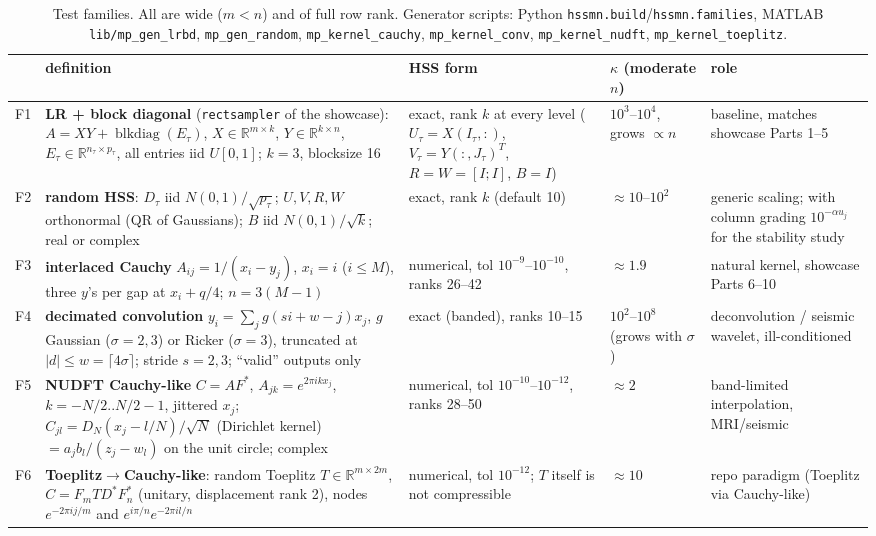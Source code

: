 \begin{table}[!htb]
\centering\footnotesize
\setlength{\tabcolsep}{3pt}
\begin{tabular}{@{}l>{\raggedright\arraybackslash}p{6.3cm}>{\raggedright\arraybackslash}p{3.4cm}>{\raggedright\arraybackslash}p{1.9cm}>{\raggedright\arraybackslash}p{2.4cm}@{}}
\toprule
& definition & HSS form & $\kappa$ (moderate $n$) & role\\
\midrule
F1 & \textbf{LR + block diagonal} (\texttt{rectsampler} of the showcase): $A=XY+\operatorname{blkdiag}(E_\tau)$, $X\in\mathbb{R}^{m\times k}$, $Y\in\mathbb{R}^{k\times n}$, $E_\tau\in\mathbb{R}^{n_\tau\times p_\tau}$, all entries iid $U[0,1]$; $k=3$, blocksize 16 & exact, rank $k$ at every level ($U_\tau=X(I_\tau,:)$, $V_\tau=Y(:,J_\tau)^T$, $R=W=[I;I]$, $B=I$) & $10^{3}$--$10^{4}$, grows $\propto n$ & baseline, matches showcase Parts 1--5\\
F2 & \textbf{random HSS}: $D_\tau$ iid $N(0,1)/\sqrt{p_\tau}$; $U,V,R,W$ orthonormal (QR of Gaussians); $B$ iid $N(0,1)/\sqrt k$; real or complex & exact, rank $k$ (default 10) & $\approx10$--$10^2$ & generic scaling; with column grading $10^{-\alpha u_j}$ for the stability study\\
F3 & \textbf{interlaced Cauchy} $A_{ij}=1/(x_i-y_j)$, $x_i=i$ ($i\le M$), three $y$'s per gap at $x_i+q/4$; $n=3(M-1)$ & numerical, tol $10^{-9}$--$10^{-10}$, ranks 26--42 & $\approx1.9$ & natural kernel, showcase Parts 6--10\\
F4 & \textbf{decimated convolution} $y_i=\sum_jg(si+w-j)x_j$, $g$ Gaussian ($\sigma=2,3$) or Ricker ($\sigma=3$), truncated at $|d|\le w=\lceil4\sigma\rceil$; stride $s=2,3$; ``valid'' outputs only & exact (banded), ranks 10--15 & $10^2$--$10^8$ (grows with $\sigma$) & deconvolution / seismic wavelet, ill-conditioned\\
F5 & \textbf{NUDFT Cauchy-like} $C=AF^*$, $A_{jk}=e^{2\pi ikx_j}$, $k=-N/2..N/2{-}1$, jittered $x_j$; $C_{jl}=D_N(x_j-l/N)/\sqrt N$ (Dirichlet kernel) $=a_jb_l/(z_j-w_l)$ on the unit circle; complex & numerical, tol $10^{-10}$--$10^{-12}$, ranks 28--50 & $\approx2$ & band-limited interpolation, MRI/seismic\\
F6 & \textbf{Toeplitz$\to$Cauchy-like}: random Toeplitz $T\in\mathbb{R}^{m\times 2m}$, $C=F_mTD^*F_n^*$ (unitary, displacement rank 2), nodes $e^{-2\pi ij/m}$ and $e^{i\pi/n}e^{-2\pi il/n}$ & numerical, tol $10^{-12}$; $T$ itself is not compressible & $\approx10$ & repo paradigm (Toeplitz via Cauchy-like)\\
\bottomrule
\end{tabular}
\caption{Test families. All are wide ($m<n$) and of full row rank. Generator scripts: Python
\texttt{hssmn.build}/\texttt{hssmn.families}, MATLAB \texttt{lib/mp\_gen\_lrbd}, \texttt{mp\_gen\_random},
\texttt{mp\_kernel\_cauchy}, \texttt{mp\_kernel\_conv}, \texttt{mp\_kernel\_nudft}, \texttt{mp\_kernel\_toeplitz}.}
\label{tab:families}
\end{table}

